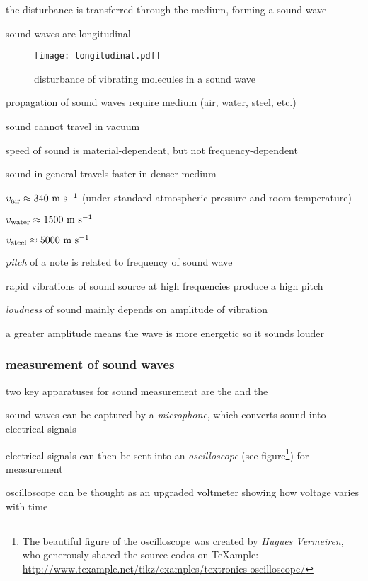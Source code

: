 the disturbance is transferred through the medium, forming a sound wave

\cmt sound waves are longitudinal
	
\begin{figure}[htp]
\centering
	\texttt{[image: longitudinal.pdf]}
	\caption*{disturbance of vibrating molecules in a sound wave}
\end{figure}

\cmt propagation of sound waves require medium (air, water, steel, etc.)
	
sound cannot travel in vacuum
	
\cmt speed of sound is material-dependent, but not frequency-dependent
	
	sound in general travels faster in denser medium
	
	\titem $v_\text{air} \approx 340 \text{ m s$^{-1}$}$ (under standard atmospheric pressure and room temperature)
	
	\titem $v_\text{water} \approx 1500 \text{ m s$^{-1}$}$
	
	\titem $v_\text{steel} \approx 5000 \text{ m s$^{-1}$}$
	
\cmt \emph{pitch} of a note is related to frequency of sound wave

rapid vibrations of sound source at high frequencies produce a high pitch

\cmt \emph{loudness} of sound mainly depends on amplitude of vibration

a greater amplitude means the wave is more energetic so it sounds louder
	

\subsubsection*{measurement of sound waves}

two key apparatuses for sound measurement are the  and the  

sound waves can be captured by a \emph{microphone}, which converts sound into electrical signals

electrical signals can then be sent into an \emph{oscilloscope} (see figure\footnote{The beautiful figure of the oscilloscope was created by \emph{Hugues Vermeiren}, who generously shared the source codes on TeXample: \url{http://www.texample.net/tikz/examples/textronics-oscilloscope/}}) for measurement

oscilloscope can be thought as an upgraded voltmeter showing how voltage varies with time

